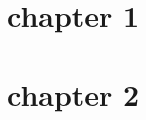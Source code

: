 \documentclass{book}
\begin{document}
\chapter{chapter 1}
\beginnumbering
\numberpstarttrue

\pstart
\lipsum[1]
\pend

\pausenumbering
\begin{pairs}
\begin{Leftside}
\resumenumbering
\numberpstartfalse
	\pstart
	\lipsum[1] 
	\pend
\pausenumbering
\end{Leftside}

\begin{Rightside}
\beginnumbering
\numberpstartfalse
	\pstart
	\lipsum[1]
	\pend
\pausenumbering
\end{Rightside}
\end{pairs}
\Columns

\numberpstarttrue
\resumenumbering


\numberpstartfalse
\endnumbering

\chapter{chapter 2}
\beginnumbering
\numberpstarttrue

\pstart
\lipsum[1]
\pend

\pausenumbering
\begin{pairs}
\begin{Leftside}
\resumenumbering
\numberpstartfalse
	\pstart
	\lipsum[1] 
	\pend
\pausenumbering
\end{Leftside}

\begin{Rightside}
\resumenumbering
\numberpstartfalse
	\pstart
	\lipsum[1]
	\pend
\pausenumbering
\end{Rightside}
\end{pairs}
\Columns
\numberpstarttrue
\resumenumbering

\pstart
\lipsum[1]
\pend

\numberpstartfalse
\endnumbering
\end{document}
